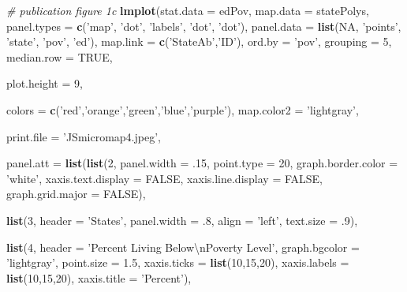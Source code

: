 \documentclass[
]{krantz}
\makeatletter
\newenvironment{Shaded}{\begin{snugshade}}{\end{snugshade}}
\newcommand{\CharTok}[1]{\textcolor[rgb]{0.5,0.5,0.5}{#1}}
\newcommand{\CommentTok}[1]{\textcolor[rgb]{0.37,0.37,0.37}{\textit{#1}}}
\newcommand{\DataTypeTok}[1]{\textcolor[rgb]{0.27,0.27,0.27}{#1}}
\newcommand{\DecValTok}[1]{\textcolor[rgb]{0.06,0.06,0.06}{#1}}
\newcommand{\FloatTok}[1]{\textcolor[rgb]{0.06,0.06,0.06}{#1}}
\newcommand{\KeywordTok}[1]{\textcolor[rgb]{0.27,0.27,0.27}{\textbf{#1}}}
\newcommand{\NormalTok}[1]{#1}
\newcommand{\OtherTok}[1]{\textcolor[rgb]{0.37,0.37,0.37}{#1}}
\newcommand{\StringTok}[1]{\textcolor[rgb]{0.5,0.5,0.5}{#1}}
\newenvironment{kframe}{%
\medskip{}
\setlength{\fboxsep}{.8em}
 \def\at@end@of@kframe{}%
 \ifinner\ifhmode%
  \def\at@end@of@kframe{\end{minipage}}%
  \begin{minipage}{\columnwidth}%
 \fi\fi%
 \def\FrameCommand##1{\hskip\@totalleftmargin \hskip-\fboxsep
 \colorbox{shadecolor}{##1}\hskip-\fboxsep
     \hskip-\linewidth \hskip-\@totalleftmargin \hskip\columnwidth}%
 \MakeFramed {\advance\hsize-\width
   \@totalleftmargin\z@ \linewidth\hsize
   \@setminipage}}%
 {\par\unskip\endMakeFramed%
 \at@end@of@kframe}
\renewenvironment{Shaded}{\begin{kframe}}{\end{kframe}}
\makeatother
\begin{document}
\begin{Shaded}
\begin{Highlighting}[]
\CommentTok{# publication figure 1c}
\KeywordTok{lmplot}\NormalTok{(}\DataTypeTok{stat.data =}\NormalTok{ edPov, }\DataTypeTok{map.data =}\NormalTok{ statePolys,}
    \DataTypeTok{panel.types =} \KeywordTok{c}\NormalTok{(}\StringTok{'map'}\NormalTok{, }\StringTok{'dot'}\NormalTok{,  }\StringTok{'labels'}\NormalTok{, }\StringTok{'dot'}\NormalTok{, }\StringTok{'dot'}\NormalTok{),}
    \DataTypeTok{panel.data =} \KeywordTok{list}\NormalTok{(}\OtherTok{NA}\NormalTok{, }\StringTok{'points'}\NormalTok{, }\StringTok{'state'}\NormalTok{, }\StringTok{'pov'}\NormalTok{, }\StringTok{'ed'}\NormalTok{),}
    \DataTypeTok{map.link =} \KeywordTok{c}\NormalTok{(}\StringTok{'StateAb'}\NormalTok{,}\StringTok{'ID'}\NormalTok{),}
    \DataTypeTok{ord.by =} \StringTok{'pov'}\NormalTok{, }
    \DataTypeTok{grouping =} \DecValTok{5}\NormalTok{, }
    \DataTypeTok{median.row =} \OtherTok{TRUE}\NormalTok{,}

    \DataTypeTok{plot.height =} \DecValTok{9}\NormalTok{, }
    
    \DataTypeTok{colors =} \KeywordTok{c}\NormalTok{(}\StringTok{'red'}\NormalTok{,}\StringTok{'orange'}\NormalTok{,}\StringTok{'green'}\NormalTok{,}\StringTok{'blue'}\NormalTok{,}\StringTok{'purple'}\NormalTok{),}
    \DataTypeTok{map.color2 =} \StringTok{'lightgray'}\NormalTok{, }
    
    \DataTypeTok{print.file =} \StringTok{'JSmicromap4.jpeg'}\NormalTok{,}

    \DataTypeTok{panel.att =} \KeywordTok{list}\NormalTok{(}\KeywordTok{list}\NormalTok{(}\DecValTok{2}\NormalTok{, }\DataTypeTok{panel.width =} \FloatTok{.15}\NormalTok{, }\DataTypeTok{point.type =} \DecValTok{20}\NormalTok{,}
                \DataTypeTok{graph.border.color =} \StringTok{'white'}\NormalTok{,}
                \DataTypeTok{xaxis.text.display =} \OtherTok{FALSE}\NormalTok{, }\DataTypeTok{xaxis.line.display =} \OtherTok{FALSE}\NormalTok{,}
                \DataTypeTok{graph.grid.major =} \OtherTok{FALSE}\NormalTok{),}

            \KeywordTok{list}\NormalTok{(}\DecValTok{3}\NormalTok{, }\DataTypeTok{header =} \StringTok{'States'}\NormalTok{, }\DataTypeTok{panel.width =} \FloatTok{.8}\NormalTok{, }
                \DataTypeTok{align =} \StringTok{'left'}\NormalTok{, }\DataTypeTok{text.size =} \FloatTok{.9}\NormalTok{),}

            \KeywordTok{list}\NormalTok{(}\DecValTok{4}\NormalTok{, }\DataTypeTok{header =} \StringTok{'Percent Living Below}\CharTok{\textbackslash{}n}\StringTok{Poverty Level'}\NormalTok{,}
                \DataTypeTok{graph.bgcolor =} \StringTok{'lightgray'}\NormalTok{, }\DataTypeTok{point.size =} \FloatTok{1.5}\NormalTok{,}
                \DataTypeTok{xaxis.ticks =} \KeywordTok{list}\NormalTok{(}\DecValTok{10}\NormalTok{,}\DecValTok{15}\NormalTok{,}\DecValTok{20}\NormalTok{), }\DataTypeTok{xaxis.labels =} \KeywordTok{list}\NormalTok{(}\DecValTok{10}\NormalTok{,}\DecValTok{15}\NormalTok{,}\DecValTok{20}\NormalTok{),}
                \DataTypeTok{xaxis.title =} \StringTok{'Percent'}\NormalTok{),}


\end{Highlighting}
\end{Shaded}
\end{document}
